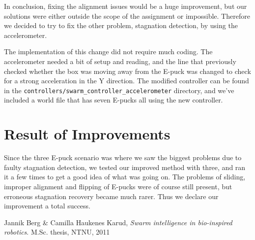 \documentclass[a4paper,12pt]{article}
\begin{document}
In conclusion, fixing the alignment issues would be a huge improvement, but our solutions were either outside the scope of the assignment or impossible. Therefore we decided to try to fix the other problem, stagnation detection, by using the accelerometer.

The implementation of this change did not require much coding. The accelerometer needed a bit of setup and reading, and the line that previously checked whether the box was moving away from the E-puck was changed to check for a strong acceleration in the Y direction. The modified controller can be found in the \texttt{controllers/swarm\_controller\_accelerometer} directory, and we've included a world file that has seven E-pucks all using the new controller.

\section{Result of Improvements}
Since the three E-puck scenario was where we saw the biggest problems due to faulty stagnation detection, we tested our improved method with three, and ran it a few times to get a good idea of what was going on. The problems of sliding, improper alignment and flipping of E-pucks were of course still present, but erroneous stagnation recovery became much rarer. Thus we declare our improvement a total success.

\begin{thebibliography}{9}

  Jannik Berg \& Camilla Haukenes Karud,
  \emph{Swarm intelligence in bio-inspired robotics}.
  M.Sc. thesis,
  NTNU,
  2011

\end{thebibliography}
\end{document}
